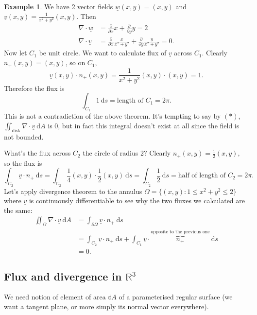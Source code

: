 \documentclass[a4paper]{article}
\theoremstyle{definition}
\newtheorem{eg}[defn]{Example}
\begin{document}
\begin{eg}
We have 2 vector fields $\underline w(x,y) = (x,y)$ and $\underline v (x,y) = \frac{1}{x^2+y^2} (x,y).$ Then
\[
\begin{aligned}
\nabla \cdot \underline w &= \frac{\partial}{\partial x} x+\frac{\partial}{\partial y}y = 2 \\
\nabla \cdot \underline v &=\frac{\partial}{\partial x} \frac{x}{x^2+y^2}+\frac{\partial}{\partial y}\frac{y}{x^2+y^2} = 0.
\end{aligned}
\tag{$\ast$}
\]
Now let $C_1$ be unit circle. We want to calculate flux of $\underline v$ across $C_1$. Clearly $n_+(x,y)=(x,y)$, so on $C_1$,
\[
\underline v(x,y)\cdot n_+(x,y) = \frac{1}{x^2+y^2}(x,y)\cdot (x,y)=1.
\]
Therefore the flux is
\[
\int_{C_1} 1 \ \mathrm d s = \text{length of }C_1 = 2\pi.
\]
This is not a contradiction of the above theorem. It's tempting to say by $(\ast)$, $\displaystyle \iint_{\text{disk}} \nabla \cdot \underline v \ \mathrm d A$ is 0, but in fact this integral doesn't exist at all since the field is not bounded.

What's the flux across $C_2$ the circle of radius 2? Clearly $n_+(x,y) = \frac12 (x,y),$ so the flux is
\[
\int_{C_2} \underline v \cdot n_+ \ \mathrm d s = \int_{C_2} \frac14 (x,y) \cdot \frac12 (x,y) \ \mathrm d s = \int_{C_2} \frac12 \ \mathrm d s = \text{half of length of }C_2 = 2\pi.
\]
Let's apply divergence theorem to the annulus $\Omega = \{(x,y) : 1\leq x^2+y^2\leq 2\}$ where $\underline v$ is continuously differentiable to see why the two fluxes we calculated are the same:
\[
\begin{aligned}
\iint_{\Omega} \nabla \cdot \underline v \ \mathrm d A &= \int_{\partial \Omega} \underline v \cdot n_+ \ \mathrm d s \\&= \int_{C_2} \underline v \cdot n_+ \ \mathrm d s + \int_{C_1} \underline v \cdot \overbrace{n_+}^{\text{opposite to the previous one}} \ \mathrm d s \\&= 0.
\end{aligned}
\]
\begin{center}
\end{center}
\end{eg}

\subsection{Flux and divergence in $\mathbb R^3$}
We need notion of element of area $\mathbb d A$ of a parameterised regular surface (we want a tangent plane, or more simply its normal vector everywhere).
\end{document}
